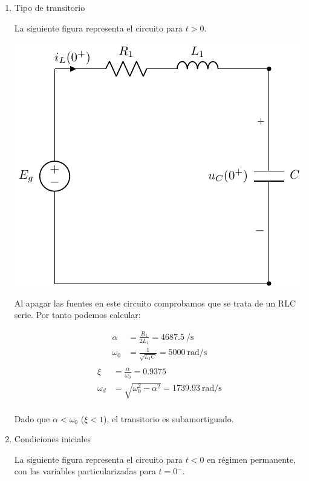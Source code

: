 \begin{enumerate}

\item Tipo de transitorio

La siguiente figura representa el circuito para $t > 0$.

\includegraphics{figuras/E1_RLC_0+.pdf}

Al apagar las fuentes en este circuito comprobamos que se trata de un RLC serie. Por tanto podemos calcular:

\begin{align*}
  \alpha &= \frac{R_1}{2L_1} = \SI{4687.5}{\per\second}\\
  \omega_0 &= \frac{1}{\sqrt{L_1C}} = \SI{5000}{\radian\per\second}\\
\end{align*}
\begin{align*}
  \xi &= \frac{\alpha}{\omega_0} = 0.9375\\
  \omega_d &= \sqrt{\omega_0^2 - \alpha^2} = \SI{1739.93}{\radian\per\second}\\
\end{align*}

Dado que $\alpha < \omega_0$ ($\xi < 1$), el transitorio es subamortiguado.

\item Condiciones iniciales

  La siguiente figura representa el circuito para $t < 0$ en régimen permanente, con las variables particularizadas para $t = 0^-$.


\end{enumerate}
